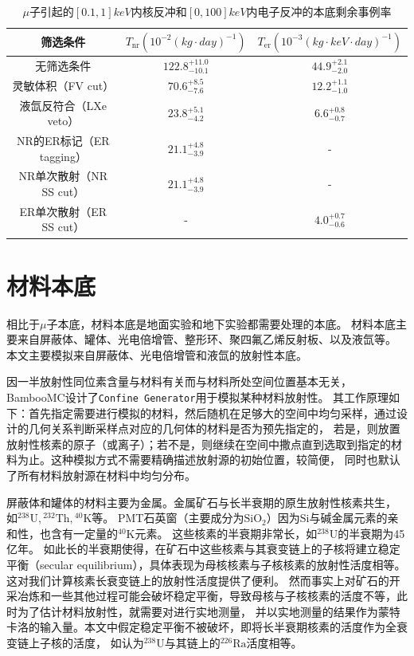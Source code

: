 \begin{table}
  \centering
  \caption{$\mu$子引起的$[0.1,1]\si{keV}$内核反冲和$[0,100]\si{keV}$内电子反冲的本底剩余事例率}
  \begin{tabular}{ccc}
    \toprule
    筛选条件 & $T_\mathrm{nr}\left(10^{-2}\left(\si{kg}\cdot\si{day}\right)^{-1}\right)$ & $T_\mathrm{er}\left(10^{-3}\left(\si{kg}\cdot\si{keV}\cdot\si{day}\right)^{-1}\right)$ \\
    \midrule
    无筛选条件 & $122.8_{-10.1}^{+11.0}$ & $44.9_{-2.0}^{+2.1}$ \\
    灵敏体积（FV cut） & $70.6_{-7.6}^{+8.5}$ & $12.2_{-1.0}^{+1.1}$ \\
    液氙反符合（LXe veto） & $23.8_{-4.2}^{+5.1}$ & $6.6_{-0.7}^{+0.8}$ \\
    NR的ER标记（ER tagging） & $21.1_{-3.9}^{+4.8}$ & - \\
    NR单次散射（NR SS cut） & $21.1_{-3.9}^{+4.8}$ & - \\
    ER单次散射（ER SS cut） & - & $4.0_{-0.6}^{+0.7}$ \\
    \bottomrule
  \end{tabular}
  \label{tab:cuts_muon_remain}
\end{table}

\section{材料本底}

相比于$\mu$子本底，材料本底是地面实验和地下实验都需要处理的本底。
材料本底主要来自屏蔽体、罐体、光电倍增管、整形环、聚四氟乙烯反射板、以及液氙等。
本文主要模拟来自屏蔽体、光电倍增管和液氙的放射性本底。

因一半放射性同位素含量与材料有关而与材料所处空间位置基本无关，BambooMC设计了\verb|Confine Generator|用于模拟某种材料放射性。
其工作原理如下：首先指定需要进行模拟的材料，然后随机在足够大的空间中均匀采样，通过设计的几何关系判断采样点对应的几何体的材料是否为预先指定的，
若是，则放置放射性核素的原子（或离子）；若不是，则继续在空间中撒点直到选取到指定的材料为止。这种模拟方式不需要精确描述放射源的初始位置，较简便，
同时也默认了所有材料放射源在材料中均匀分布。

屏蔽体和罐体的材料主要为金属。金属矿石与长半衰期的原生放射性核素共生，
如${}^{238}\mathrm{U},{}^{232}\mathrm{Th},{}^{40}\mathrm{K}$等。
PMT石英窗（主要成分为$\mathrm{Si}\mathrm{O}_2$）因为$\mathrm{Si}$与碱金属元素的亲和性，也含有一定量的${}^{40}\mathrm{K}$元素。
这些核素的半衰期非常长，如${}^{238}\mathrm{U}$的半衰期为45亿年。
如此长的半衰期使得，在矿石中这些核素与其衰变链上的子核将建立稳定平衡（secular equilibrium），具体表现为母核核素与子核核素的放射性活度相等。
这对我们计算核素长衰变链上的放射性活度提供了便利。
然而事实上对矿石的开采冶炼和一些其他过程可能会破坏稳定平衡，导致母核与子核核素的活度不等，此时为了估计材料放射性，就需要对进行实地测量，
并以实地测量的结果作为蒙特卡洛的输入量。本文中假定稳定平衡不被破坏，即将长半衰期核素的活度作为全衰变链上子核的活度，
如认为${}^{238}\mathrm{U}$与其链上的${}^{226}\mathrm{Ra}$活度相等。

